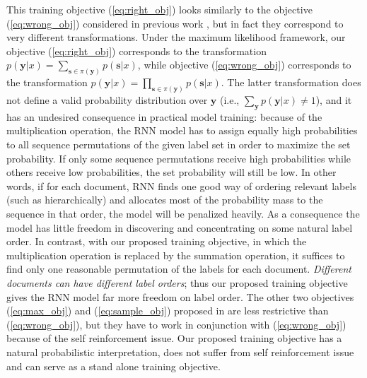 This training objective (\ref{eq:right_obj}) looks similarly to the objective (\ref{eq:wrong_obj}) considered in previous work \cite{vinyals2015order}, but in fact they correspond to very different transformations. Under the maximum likelihood framework, our objective (\ref{eq:right_obj}) corresponds to the transformation $p(\mathbf{y}|x)=\sum_{\mathbf{s}\in \pi(\mathbf{y})} p(\mathbf{s}|x)$, while objective (\ref{eq:wrong_obj}) corresponds to the transformation $p(\mathbf{y}|x)=\prod_{\mathbf{s}\in \pi(\mathbf{y})} p(\mathbf{s}|x)$. The latter transformation does not define a valid probability distribution over $\mathbf{y}$ (i.e., $\sum_{\mathbf{y}} p(\mathbf{y}|x)\neq 1$), and it has an undesired  consequence in practical model training: because of the multiplication operation, the RNN model has to assign equally high probabilities to all sequence permutations of the given label set in order to maximize the set probability. If only some sequence permutations receive high probabilities while others receive low probabilities, the set probability will still be low. In other words, if for each document, RNN finds one  good way of ordering relevant labels (such as hierarchically) and allocates most of the probability mass to the sequence in that order, the model will be penalized heavily.  As a consequence the model has little freedom in discovering and concentrating on some natural label order. In contrast, with our proposed training objective, in which the multiplication operation is replaced by the  summation operation, it suffices to find only one reasonable permutation of the labels for each document. \emph{Different documents can have different label orders}; thus our proposed training objective gives the RNN model far more freedom on label order. The other two objectives (\ref{eq:max_obj}) and (\ref{eq:sample_obj}) proposed in \cite{vinyals2015order} are less restrictive than  (\ref{eq:wrong_obj}), but they have to work in conjunction with (\ref{eq:wrong_obj}) because of the self reinforcement issue. Our proposed training objective has a natural probabilistic interpretation, does not suffer from self reinforcement issue and can serve as a stand alone training objective. 

